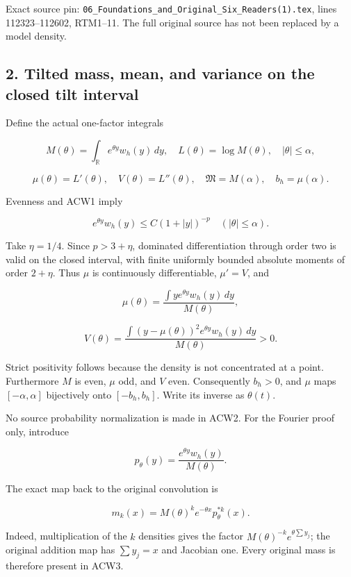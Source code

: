 \documentclass[11pt,a4paper]{article}
\begin{document}
Exact source pin: \texttt{06\_Foundations\_and\_Original\_Six\_Readers(1).tex}, lines 112323--112602, RTM1--11. The full original source has not been replaced by a model density.

\subsection{2. Tilted mass, mean, and variance on the closed tilt interval}\label{acw:tilted-mass-mean-and-variance-on-the-closed-tilt-interval}

Define the actual one-factor integrals

\[
M(\theta)=\int_{\mathbb R}e^{\theta y}w_h(y)\,dy,
\quad L(\theta)=\log M(\theta),\quad |\theta|\le\alpha,
\]

\[
\mu(\theta)=L'(\theta),\quad V(\theta)=L''(\theta),\quad
\mathfrak M=M(\alpha),\quad b_h=\mu(\alpha).
\tag{ACW2}
\]

Evenness and ACW1 imply

\[
e^{\theta y}w_h(y)\le C(1+|y|)^{-p}
\quad(|\theta|\le\alpha).
\]

Take \(\eta=1/4\). Since \(p>3+\eta\), dominated differentiation through order two is valid on the closed interval, with finite uniformly bounded absolute moments of order \(2+\eta\). Thus \(\mu\) is continuously differentiable, \(\mu'=V\), and

\[
\mu(\theta)=\frac{\int y e^{\theta y}w_h(y)\,dy}{M(\theta)},
\]

\[
V(\theta)=\frac{\int (y-\mu(\theta))^2e^{\theta y}w_h(y)\,dy}{M(\theta)}>0.
\]

Strict positivity follows because the density is not concentrated at a point. Furthermore \(M\) is even, \(\mu\) odd, and \(V\) even. Consequently \(b_h>0\), and \(\mu\) maps \([-\alpha,\alpha]\) bijectively onto \([-b_h,b_h]\). Write its inverse as \(\theta(t)\).

No source probability normalization is made in ACW2. For the Fourier proof only, introduce

\[
p_\theta(y)=\frac{e^{\theta y}w_h(y)}{M(\theta)}.
\]

The exact map back to the original convolution is

\[
\boxed{m_k(x)=M(\theta)^k e^{-\theta x}p_\theta^{*k}(x).}
\tag{ACW3}
\]

Indeed, multiplication of the \(k\) densities gives the factor
\(M(\theta)^{-k}e^{\theta\sum y_j}\); the original addition map has \(\sum y_j=x\) and Jacobian one. Every original mass is therefore present in ACW3.
\end{document}
